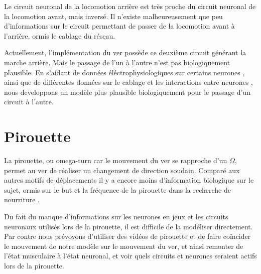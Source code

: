 Le circuit neuronal de la locomotion arrière est très proche du circuit neuronal de la locomotion
avant, mais inversé\cite{Boyle2009}. Il n'existe malheureusement que peu d'informations sur le circuit
permettant de passer de la locomotion avant à l'arrière, ormis le cablage du réseau.

Actuellement, l'implémentation du ver possède ce deuxième circuit générant la marche arrière. Mais
le passage de l'un à l'autre n'est pas biologiquement plausible. En s'aidant de données
éléctrophysiologiques sur certains neurones \cite{Mellem2008a,Lockery2009}, ainsi que de différentes
données sur le cablage et les interactions entre neurones
\cite{Chalfie1985,Gray2005,Chen2006,Varshney2011,Leifer2011}, nous developpons un modèle plus
plausible biologiquement pour le passage d'un circuit à l'autre.


\section{Pirouette} %
\label{sec:Pirouette}

La pirouette, ou omega-turn car le mouvement du ver se rapproche d'un $\Omega$, permet au ver
de réaliser un changement de direction soudain. Comparé aux autres motifs de déplacements il y a encore
moins d'information biologique sur le sujet, ormis sur le but et la fréquence de la pirouette dans
la recherche de nourriture \cite{Gray2005}.

Du fait du manque d'informations sur les neurones en jeux et les circuits neuronaux utilisés lors de
la pirouette, il est difficile de la modéliser directement. Par contre nous prévoyons d'utiliser des
vidéos de pirouette et de faire coïncider le mouvement de notre modèle sur le mouvement du ver, et
ainsi remonter de l'état musculaire à l'état neuronal, et voir quels circuits et neurones seraient actifs
lors de la pirouette.


